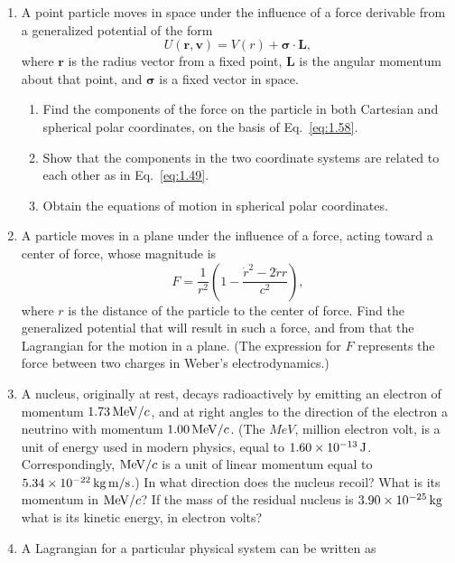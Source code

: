\begin{enumerate}[resume]
    \item A point particle moves in space under the influence of a force derivable from a generalized potential of the form
    \begin{equation*}
        U\left(\symbf{r},\symbf{v}\right)=V\left(r\right)+\symbf{\sigma}\cdot\symbf{L},
    \end{equation*}
    where \(\symbf{r}\) is the radius vector from a fixed point, \(\symbf{L}\) is the angular momentum about that point, and \(\symbf{\sigma}\) is a fixed vector in space.
    \begin{enumerate}
        \item Find the components of the force on the particle in both Cartesian and spherical polar coordinates, on the basis of Eq.~\eqref{eq:1.58}.
        \item Show that the components in the two coordinate systems are related to each other as in Eq.~\eqref{eq:1.49}.
        \item Obtain the equations of motion in spherical polar coordinates.
    \end{enumerate}
    \item A particle moves in a plane under the influence of a force, acting toward a center of force, whose magnitude is
    \begin{equation*}
        F=\frac{1}{r^2}\left(1-\frac{\dot{r}^2-2\ddot{r}r}{c^2}\right),
    \end{equation*}
    where \(r\) is the distance of the particle to the center of force. Find the generalized potential that will result in such a force, and from that the Lagrangian for the motion in a plane. (The expression for \(F\) represents the force between two charges in Weber's electrodynamics.)
    \item A nucleus, originally at rest, decays radioactively by emitting an electron of momentum \(\qty{1.73}{MeV/\mathnormal{c}}\), and at right angles to the direction of the electron a neutrino with momentum \(\qty{1.00}{MeV/\mathnormal{c}}\). (The \(\unit{MeV}\), million electron volt, is a unit of energy used in modern physics, equal to \(\qty{1.60\times10^{-13}}{J}\). Correspondingly, \(\unit{MeV/\mathnormal{c}}\) is a unit of linear momentum equal to \(\qty{5.34\times10^{-22}}{kg.m/s}\).) In what direction does the nucleus recoil? What is its momentum in \(\unit{MeV/\mathnormal{c}}\)? If the mass of the residual nucleus is \(\qty{3.90\times10^{-25}}{kg}\) what is its kinetic energy, in electron volts?
    \item A Lagrangian for a particular physical system can be written as

\end{enumerate}

